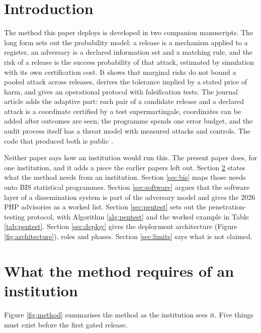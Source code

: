 \documentclass[11pt,a4paper]{article}
\begin{document}
\section{Introduction}\label{sec:intro}
The method this paper deploys is developed in two companion manuscripts. The long form \citep{mahomane2026long} sets out the probability model: a release is a mechanism applied to a register, an adversary is a declared information set and a matching rule, and the risk of a release is the success probability of that attack, estimated by simulation with its own certification cost. It shows that marginal risks do not bound a pooled attack across releases, derives the tolerance implied by a stated price of harm, and gives an operational protocol with falsification tests. The journal article \citep{mahomane2026adaptive} adds the adaptive part: each pair of a candidate release and a declared attack is a coordinate certified by a test supermartingale, coordinates can be added after outcomes are seen, the programme spends one error budget, and the audit process itself has a threat model with measured attacks and controls. The code that produced both is public \citep{privacyriskcode}.

Neither paper says how an institution would run this. The present paper does, for one institution, and it adds a piece the earlier papers left out. Section \ref{sec:requirements} states what the method needs from an institution. Section \ref{sec:bis} maps those needs onto BIS statistical programmes. Section \ref{sec:software} argues that the software layer of a dissemination system is part of the adversary model and gives the 2026 PHP advisories as a worked list. Section \ref{sec:pentest} sets out the penetration-testing protocol, with Algorithm \ref{alg:pentest} and the worked example in Table \ref{tab:pentest}. Section \ref{sec:deploy} gives the deployment architecture (Figure \ref{fig:architecture}), roles and phases. Section \ref{sec:limits} says what is not claimed.

\section{What the method requires of an institution}\label{sec:requirements}
Figure \ref{fig:method} summarises the method as the institution sees it. Five things must exist before the first gated release.
\end{document}

